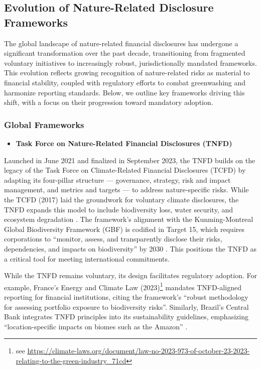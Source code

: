\documentclass[
  authoryear]{elsarticle}
\providecommand{\tightlist}{%
  \setlength{\itemsep}{0pt}\setlength{\parskip}{0pt}}\usepackage{longtable,booktabs,array}
\begin{document}
\subsection{Evolution of Nature-Related Disclosure
Frameworks}\label{evolution-of-nature-related-disclosure-frameworks}

The global landscape of nature-related financial disclosures has
undergone a significant transformation over the past decade,
transitioning from fragmented voluntary initiatives to increasingly
robust, jurisdictionally mandated frameworks. This evolution reflects
growing recognition of nature-related risks as material to financial
stability, coupled with regulatory efforts to combat greenwashing and
harmonize reporting standards. Below, we outline key frameworks driving
this shift, with a focus on their progression toward mandatory adoption.

\subsubsection{Global Frameworks}\label{global-frameworks}

\begin{itemize}
\tightlist
\item
  \textbf{Task Force on Nature-Related Financial Disclosures (TNFD)}
\end{itemize}

Launched in June 2021 and finalized in September 2023, the TNFD builds
on the legacy of the Task Force on Climate-Related Financial Disclosures
(TCFD) by adapting its four-pillar structure --- governance, strategy,
risk and impact management, and metrics and targets --- to address
nature-specific risks. While the TCFD (2017) laid the groundwork for
voluntary climate disclosures, the TNFD expands this model to include
biodiversity loss, water security, and ecosystem degradation
\citep[see][]{TNFD2023}. The framework's alignment with the
Kunming-Montreal Global Biodiversity Framework (GBF) is codified in
Target 15, which requires corporations to ``monitor, assess, and
transparently disclose their risks, dependencies, and impacts on
biodiversity'' by 2030 \citep{CBD2023}. This positions the TNFD as a
critical tool for meeting international commitments.

While the TNFD remains voluntary, its design facilitates regulatory
adoption. For example, France's Energy and Climate Law (2023)\footnote{see
  \url{https://climate-laws.org/document/law-no-2023-973-of-october-23-2023-relating-to-the-green-industry_71cd}}
mandates TNFD-aligned reporting for financial institutions, citing the
framework's ``robust methodology for assessing portfolio exposure to
biodiversity risks''. Similarly, Brazil's Central Bank integrates TNFD
principles into its sustainability guidelines, emphasizing
``location-specific impacts on biomes such as the Amazon''
\citep{STUSSI2024}.
\end{document}
